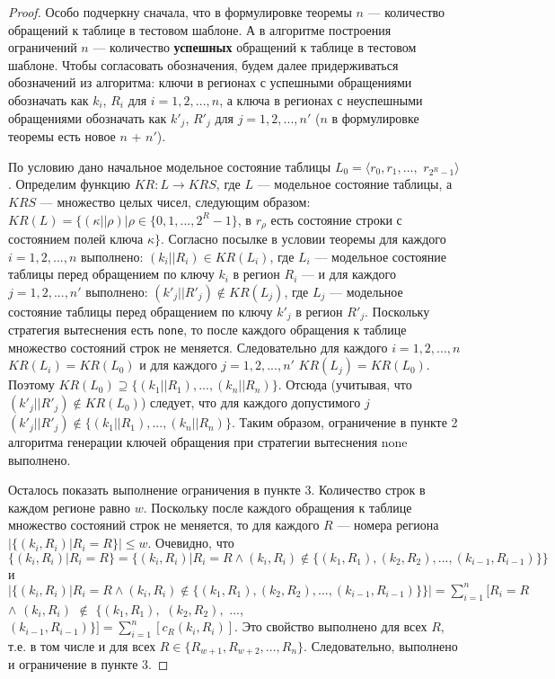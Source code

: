\theoremtext{\ref{mirror_fullness_none}}{\FullnessMirrorNone}
\begin{proof}
  Особо подчеркну сначала, что в формулировке теоремы $n$ --- количество обращений к таблице в тестовом шаблоне. А в алгоритме построения ограничений $n$ --- количество \textbf{успешных} обращений к таблице в тестовом шаблоне. Чтобы согласовать обозначения, будем далее придерживаться обозначений из алгоритма: ключи в регионах с успешными обращениями обозначать как $k_i$, $R_i$ для $i = 1, 2, ..., n$, а ключа в регионах с неуспешными обращениями обозначать как $k'_j$, $R'_j$ для $j = 1, 2, ..., n'$ ($n$ в формулировке теоремы есть новое $n$ + $n'$).

  По условию дано начальное модельное состояние таблицы $L_0 = \langle r_0, r_1, ...,$ $r_{2^R-1} \rangle$. Определим функцию $KR: L \rightarrow KRS$, где $L$ --- модельное состояние таблицы, а $KRS$ --- множество целых чисел, следующим образом: $KR(L) = \{(\kappa||\rho) | \rho \in \{0, 1, ..., 2^R{-}1\}$, в $r_{\rho}$ есть состояние строки с состоянием полей ключа $\kappa\}$. Согласно посылке в условии теоремы для каждого $i = 1, 2, ..., n$ выполнено: $(k_i || R_i) \in KR(L_i)$, где $L_i$ --- модельное состояние таблицы перед обращением по ключу $k_i$ в регион $R_i$ --- и для каждого $j = 1, 2, ..., n'$ выполнено: $(k'_j || R'_j) \notin KR(L_j)$, где $L_j$ --- модельное состояние таблицы перед обращением по ключу $k'_j$ в регион $R'_j$. Поскольку стратегия вытеснения есть \texttt{none}, то после каждого обращения к таблице множество состояний строк не меняется. Следовательно для каждого $i = 1, 2, ..., n$ $KR(L_i) = KR(L_0)$ и для каждого $j = 1, 2, ..., n'$ $KR(L_j) = KR(L_0)$. Поэтому $KR(L_0) \supseteq \{ (k_1||R_1), ..., (k_n||R_n) \}$. Отсюда (учитывая, что $(k'_j||R'_j) \notin KR(L_0)$) следует, что для каждого допустимого $j$ $(k'_j||R'_j) \notin \{ (k_1||R_1), ..., (k_n||R_n) \}$. Таким образом, ограничение в пункте 2 алгоритма генерации ключей обращения при стратегии вытеснения none выполнено.

  Осталось показать выполнение ограничения в пункте 3. Количество строк в каждом регионе равно $w$. Поскольку после каждого обращения к таблице множество состояний строк не меняется, то для каждого $R$ --- номера региона $|\{(k_i, R_i)|R_i = R\}| \leqslant w$. Очевидно, что $\{(k_i, R_i)|R_i = R\} = \{(k_i, R_i)|R_i = R \wedge (k_i, R_i) \notin \{(k_1, R_1), (k_2, R_2), ..., (k_{i-1}, R_{i-1})\}\}$ и $|\{(k_i, R_i)|R_i = R \wedge (k_i, R_i) \notin \{(k_1, R_1), (k_2, R_2), ..., (k_{i-1}, R_{i-1})\}\}| = \sum_{i=1}^n [R_i = R$ $\wedge$ $(k_i, R_i)$ $\notin$ $\{(k_1, R_1),$ $(k_2, R_2),$ ..., $(k_{i-1}, R_{i-1})\}] = \sum_{i=1}^n [c_R(k_i, R_i)]$. Это свойство выполнено для всех $R$, т.е. в том числе и для всех $R \in \{R_{w+1}, R_{w+2}, ..., R_n\}$. Следовательно, выполнено и ограничение в пункте 3.
\end{proof}

